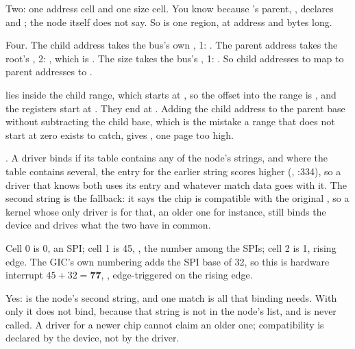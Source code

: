  Two: one address cell and one size cell. You know because 's parent,
, declares  and ; the node
itself does not say. So  is one region, at address  and
 bytes long.

 Four. The child address takes the bus's own , 1: . The
parent address takes the root's , 2: , which is
. The size takes the bus's , 1: . So child
addresses  to  map to parent addresses  to
.

  lies inside the child range, which starts at , so the offset
into the range is , and the registers start at
 \textbf{}. They end at
. Adding the child address to the parent base without
subtracting the child base, which is the mistake a range that does not start at zero exists to
catch, gives , one page too high.

 . A driver binds if its table contains any of the node's strings, and
where the table contains several, the entry for the earlier string scores higher
(, :334), so a driver that knows both uses
its  entry and whatever match data goes with it. The second string is the fallback:
it says the chip is compatible with the original , so a kernel whose only driver is for
that, an older one for instance, still binds the device and drives what the two have in common.

 Cell 0 is 0, an SPI; cell 1 is 45, , the number among the SPIs; cell 2 is 1,
rising edge. The GIC's own numbering adds the SPI base of 32, so this is hardware interrupt
$45 + 32 = \mathbf{77}$, , edge-triggered on the rising edge.

 Yes:  is the node's second string, and one match is all that binding
needs. With only  it does not bind, because that string is not in the node's
list, and  is never called. A driver for a newer chip cannot claim an older one;
compatibility is declared by the device, not by the driver.

